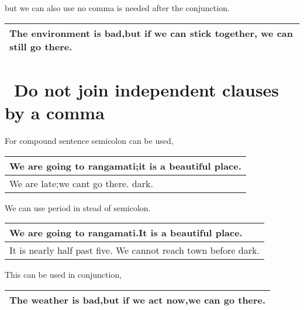 \documentclass[10pt]{report}
\begin{document}
 \pagebreak
 
 
but we can also use no comma is needed after the conjunction.

 \begin{table}[!tbh]
    \centering
        \begin{tabular}{|l|}
        \hline
     The environment is bad,but if we can stick together, we can still go there.\\
        \hline
        

 \end{tabular}
 \end{table}  
	
	
	\section {\bfseries \ Do not join independent clauses by a comma}
	
	For compound sentence semicolon can be used,

\begin{table}[!tbh]
    \centering
        \begin{tabular}{|l|}
        \hline
     We are going to rangamati;it is a beautiful place.\\
        \hline
        We are late;we cant go there.
dark.\\
\hline
        

 \end{tabular}
 \end{table}




We can use period in stead of semicolon.
\begin{table}[!tbh]
    \centering
        \begin{tabular}{|l|}
        \hline
     We are going to rangamati.It is a beautiful place.\\
        \hline
        It is nearly half past five. We cannot reach town
before dark.\\
\hline
        

 \end{tabular}
 \end{table}
 
 \pagebreak
 
 This can be used in conjunction,
 \begin{table}[!tbh]
    \centering
        \begin{tabular}{|l|}
        \hline
     The weather is bad,but if we act now,we can go there.\\ 
        \hline
        

 \end{tabular}
 \end{table}
        
\end{document}
